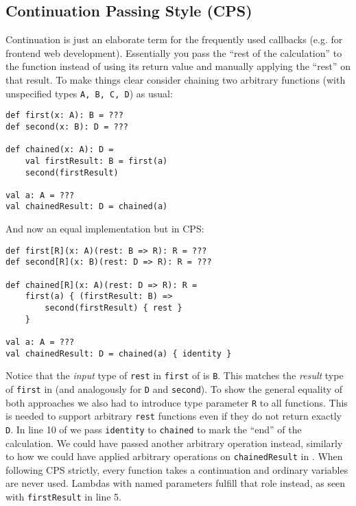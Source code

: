 \subsection{Continuation Passing Style (CPS)} \label{sec:cps}

Continuation is just an elaborate term for the frequently used callbacks (e.g. for frontend web development). Essentially you pass the ``rest of the calculation'' to the function instead of using its return value and manually applying the ``rest'' on that result. To make things clear consider chaining two arbitrary functions (with unspecified types \lstinline{A, B, C, D}) as usual:
\begin{lstlisting}[caption={Ordinary chaining}, label={lst:ordinaryChaining}]
def first(x: A): B = ???
def second(x: B): D = ???

def chained(x: A): D =
    val firstResult: B = first(a)
    second(firstResult)

val a: A = ???
val chainedResult: D = chained(a)

\end{lstlisting}
And now an equal implementation but in CPS:
\begin{lstlisting}[caption={CPS chaining}, label={lst:cpsChaining}]
def first[R](x: A)(rest: B => R): R = ???
def second[R](x: B)(rest: D => R): R = ???

def chained[R](x: A)(rest: D => R): R =
    first(a) { (firstResult: B) => 
        second(firstResult) { rest }
    }    
    
val a: A = ???
val chainedResult: D = chained(a) { identity }
\end{lstlisting}
Notice that the \emph{input} type of \lstinline{rest} in \lstinline{first} of  is \lstinline{B}. This matches the \emph{result} type of \lstinline{first} in  (and analogously for \lstinline{D} and \lstinline{second}). To show the general equality of both approaches we also had to introduce type parameter \lstinline{R} to all functions. This is needed to support arbitrary \lstinline{rest} functions even if they do not return exactly \lstinline{D}. In line 10 of  we pass \lstinline{identity} to \lstinline{chained} to mark the ``end'' of the calculation. We could have passed another arbitrary operation instead, similarly to how we could have applied arbitrary operations on \lstinline{chainedResult} in . When following CPS strictly, every function takes a continuation and ordinary variables are never used. Lambdas with named parameters fulfill that role instead, as seen with \lstinline{firstResult} in line 5.

